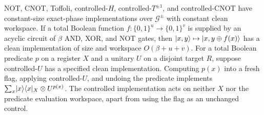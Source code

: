 \begin{lemma}\label{lem:synthesis}
NOT, CNOT, Toffoli, controlled-$H$, controlled-$T^{\pm1}$, and
controlled-CNOT have constant-size exact-phase implementations over
$\mathcal G^{\pm}$ with constant clean workspace. If a total Boolean
function $f:\{0,1\}^u\to\{0,1\}^v$ is supplied by an acyclic circuit
of $\beta$ AND, XOR, and NOT gates, then
$\lvert x,y\rangle\mapsto\lvert x,y\oplus f(x)\rangle$ has a clean implementation of
size and workspace $O(\beta+u+v)$. For a total Boolean predicate $p$ on
a register $X$ and a unitary $U$ on a disjoint target $R$, suppose
controlled-$U$ has a specified clean implementation. Computing $p(x)$
into a fresh flag, applying controlled-$U$, and undoing the predicate
implements $\sum_x\lvert x\rangle\langle x\rvert_X\otimes U^{p(x)}$.
The controlled implementation acts on neither $X$ nor the predicate
evaluation workspace, apart from using the flag as an unchanged control.
\end{lemma}
